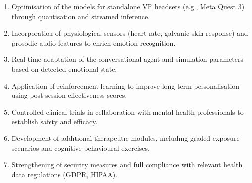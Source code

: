 \begin{enumerate}
    \item Optimisation of the models for standalone VR headsets (e.g., Meta Quest 3) through quantisation and streamed inference.
    \item Incorporation of physiological sensors (heart rate, galvanic skin response) and prosodic audio features to enrich emotion recognition.
    \item Real-time adaptation of the conversational agent and simulation parameters based on detected emotional state.
    \item Application of reinforcement learning to improve long-term personalisation using post-session effectiveness scores.
    \item Controlled clinical trials in collaboration with mental health professionals to establish safety and efficacy.
    \item Development of additional therapeutic modules, including graded exposure scenarios and cognitive-behavioural exercises.
    \item Strengthening of security measures and full compliance with relevant health data regulations (GDPR, HIPAA).
\end{enumerate}
